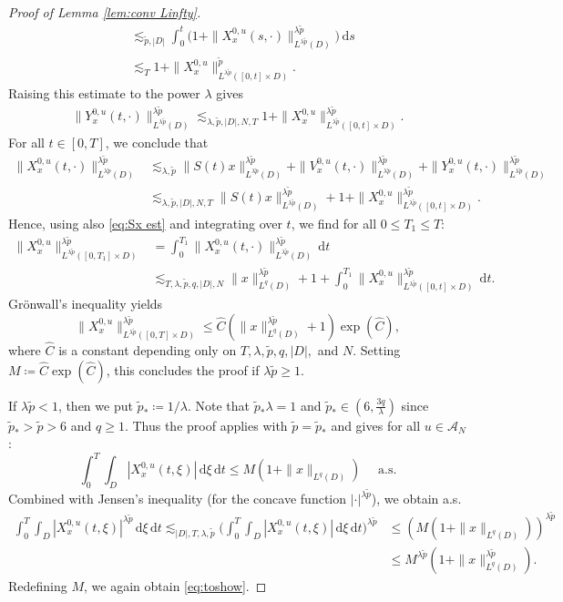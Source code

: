 \documentclass{amsart}
\theoremstyle{plain}
\theoremstyle{remark}
\theoremstyle{plain}
\numberwithin{equation}{section}
\newcommand{\ceqq}{\coloneqq}
\newcommand{\A}{{\mathcal A}}
\newcommand{\dd}{\,\mathrm{d}}
\begin{document}
\begin{proof}[Proof of Lemma \ref{lem:conv Linfty}]
\begin{align*}
  &\lesssim_{\tilde p,|D|} \int_0^t \big(1+\|X_x^{0,u}(s,\cdot)\|_{L^{\lambda \tilde p}(D)}^{\lambda \tilde p}\big)\dd s\\ 
  &\lesssim_T 1 + \|X_x^{0,u}\|_{L^{\lambda \tilde p}([0,t]\times D)}^{\tilde p}.
\end{align*}
Raising this estimate to the power $\lambda$ gives
\begin{align*}
  \|Y_x^{0,u}(t,\cdot)\|_{L^{\lambda\tilde p}(D)}^{\lambda\tilde p} \lesssim_{\lambda,\tilde p,|D|, N,T}   1 + \|X_x^{0,u}\|_{L^{\lambda\tilde p}([0,t]\times D)}^{\lambda\tilde p}.
\end{align*}
For all $t\in[0,T]$, we conclude that 
\begin{align*}
 \|X_x^{0,u}(t,\cdot)\|_{L^{\lambda \tilde p}(D)}^{\lambda \tilde p}
 &\lesssim_{\lambda, \tilde p} \|S(t)x\|_{L^{\lambda \tilde p}(D)}^{\lambda \tilde p}+\|V_x^{0,u}(t,\cdot)\|_{L^{\lambda \tilde p}(D)}^{\lambda \tilde p}+\|Y_x^{0,u}(t,\cdot)\|_{L^{\lambda \tilde p}(D)}^{\lambda \tilde p} \\
 &\lesssim_{\lambda,\tilde p,|D|, N,T} \|S(t)x\|_{L^{\lambda \tilde p}(D)}^{\lambda \tilde p}+ 1 + \|X_x^{0,u} \|_{L^{\lambda \tilde p}([0,t]\times D)}^{\lambda \tilde p}. 
\end{align*}
Hence, using also \eqref{eq:Sx est} and integrating over $t$,  we find  for all $0\leq  T_1\leq T$:
\begin{align*}
\|X_x^{0,u} \|_{L^{\lambda \tilde p}([0,T_1]\times D)}^{\lambda \tilde p}&= \int_0^{T_1}\|X_x^{0,u}(t,\cdot)\|_{L^{\lambda \tilde p}(D)}^{\lambda \tilde p}\dd t\\
 &\lesssim_{T,\lambda,\tilde p,q,|D|, N} \|x\|_{L^q(D)}^{\lambda \tilde p}+ 1 +\int_0^{T_1} \|X_x^{0,u} \|_{L^{\lambda \tilde p}([0,t]\times D)}^{\lambda \tilde p}\dd t.  
\end{align*} 
Gr\"onwall's inequality yields
\[
\|X_x^{0,u} \|_{L^{\lambda \tilde p}([0,T]\times D)}^{\lambda \tilde p}\leq \hat C(\|x\|_{L^q(D)}^{\lambda \tilde p}+ 1)\exp(\hat C),
\]
where $\hat C$ is a constant depending only on $T,\lambda,\tilde p,q,|D|,$ and $N$. Setting  $M\ceqq\hat C \exp(\hat C)$, this concludes the proof if $\lambda\tilde p\geq 1$.  

If $\lambda\tilde p<1$, then we put $\tilde p_*\ceqq 1/\lambda$. Note that $\tilde p_*\lambda=1$ and $\tilde p_*\in(6,\frac{3q}{\lambda})$ since $\tilde p_*>\tilde p>6$ and $q\geq 1$. Thus the proof applies with $\tilde p=\tilde p_*$ and gives for all $u\in\A_N$: 
\[
\int_0^T\int_D  |X_x^{0,u}(t,\xi)| \dd\xi\dd t \leq M(1+\|x\|_{L^q(D)})\quad \text{ a.s.}
\]
Combined with Jensen's inequality (for the concave function $|\cdot|^{\lambda \tilde p}$), we obtain a.s.
\begin{align*}
\int_0^T\int_D  |X_x^{0,u}(t,\xi)|^{\lambda \tilde p}\dd\xi\dd t\lesssim_{|D|,T,\lambda,\tilde p}
    \Big(\int_0^T\int_D  |X_x^{0,u}(t,\xi)| \dd\xi\dd t\Big)^{\lambda\tilde p} 
    &\leq (M(1+\|x\|_{L^q(D)}))^{\lambda\tilde p}\\
    &\leq M^{\lambda\tilde p}(1+\|x\|_{L^q(D)}^{\lambda \tilde p}).
\end{align*} 
Redefining $M$, we again obtain \eqref{eq:toshow}.
\end{proof}
\end{document}
